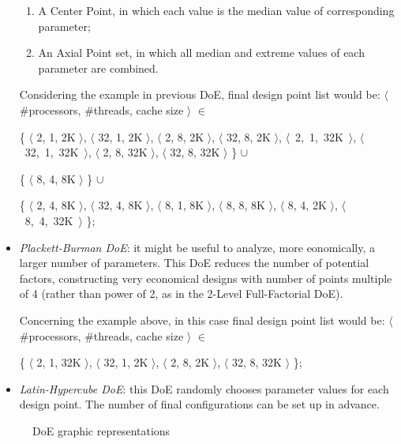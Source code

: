 \begin{itemize}
\begin{enumerate}
        \item A Center Point, in which each value is the median value of corresponding parameter;
        
        \item An Axial Point set, in which all median and extreme values of each parameter are combined.
    
    \end{enumerate}
    
    Considering the example in previous DoE, final design point list would be: $\langle$ \#processors, \#threads, cache size $\rangle$ $\in$
    
    \{ $\langle$ 2, 1, 2K $\rangle$, $\langle$ 32, 1, 2K $\rangle$, $\langle$ 2, 8, 2K $\rangle$, $\langle$ 32, 8, 2K $\rangle$, \hbox{$\langle$ 2, 1, 32K $\rangle$}, \hbox{$\langle$ 32, 1, 32K $\rangle$}, $\langle$ 2, 8, 32K $\rangle$, $\langle$ 32, 8, 32K $\rangle$ \} $\cup$ 
    
    \{ $\langle$ 8, 4, 8K $\rangle$ \} $\cup$
    
    \{ $\langle$ 2, 4, 8K $\rangle$, $\langle$ 32, 4, 8K $\rangle$, $\langle$ 8, 1, 8K $\rangle$, $\langle$ 8, 8, 8K $\rangle$, $\langle$ 8, 4, 2K $\rangle$, \hbox{$\langle$ 8, 4, 32K $\rangle$} \};
    
    \item \textit{Plackett-Burman DoE}: it might be useful to analyze, more eonomically, a larger number of parameters. This DoE reduces the number of potential factors, constructing very economical designs with number of points multiple of 4 (rather than power of 2, as in the 2-Level Full-Factorial DoE).
    
    Concerning the example above, in this case final design point list would be: $\langle$ \#processors, \#threads, cache size $\rangle$ $\in$
    
    \{ $\langle$ 2, 1, 32K $\rangle$, $\langle$ 32, 1, 2K $\rangle$, $\langle$ 2, 8, 2K $\rangle$, $\langle$ 32, 8, 32K $\rangle$ \};
    
    \item \textit{Latin-Hypercube DoE}: this DoE randomly chooses parameter values for each design point. The number of final configurations can be set up in advance.

\end{itemize}


\begin{figure}[htb]

    \centering

    \enskip
    
    \caption{DoE graphic representations}

\end{figure}





